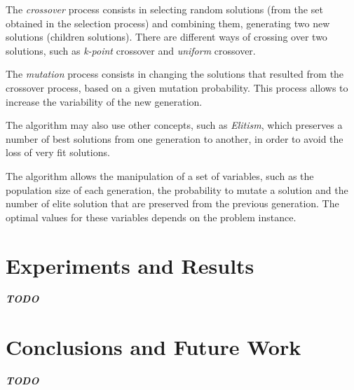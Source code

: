 \documentclass[conference]{IEEEtran}
\begin{document}
The \textit{crossover} process consists in selecting random solutions (from the set obtained in the selection process) and combining them, generating two new solutions (children solutions). There are different ways of crossing over two solutions, such as \textit{k-point} crossover and \textit{uniform} crossover.

The \textit{mutation} process consists in changing the solutions that resulted from the crossover process, based on a given mutation probability. This process allows to increase the variability of the new generation.

The algorithm may also use other concepts, such as \textit{Elitism}, which preserves a number of best solutions from one generation to another, in order to avoid the loss of very fit solutions.

The algorithm allows the manipulation of a set of variables, such as the population size of each generation, the probability to mutate a solution and the number of elite solution that are preserved from the previous generation. The optimal values for these variables depends on the problem instance.

\section{Experiments and Results}

\textbf{\textit{TODO}}

\section{Conclusions and Future Work}

\textbf{\textit{TODO}}

\begin{thebibliography}{00}
    



\end{thebibliography}
\end{document}
